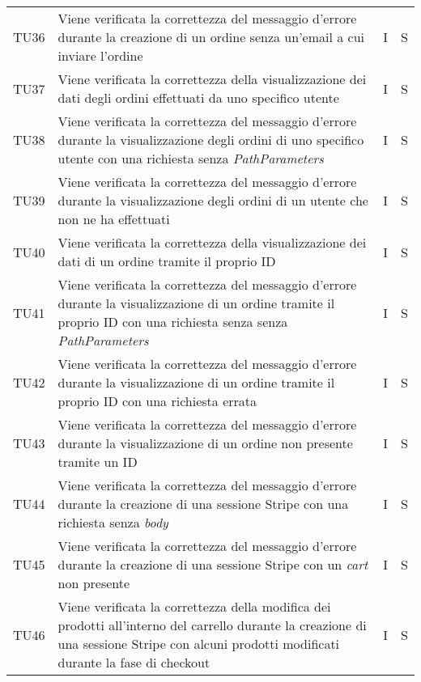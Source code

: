 {\begin{longtable}{C{2cm} C{9.6cm} C{1.5cm} C{1cm}}
TU36 & Viene verificata la correttezza del messaggio d'errore durante la creazione di un ordine senza un'email a cui inviare l'ordine & I & S\\

TU37 & Viene verificata la correttezza della visualizzazione dei dati degli ordini effettuati da uno specifico utente & I & S\\

TU38 & Viene verificata la correttezza del messaggio d'errore durante la visualizzazione degli ordini di uno specifico utente con una richiesta senza \textit{PathParameters} & I & S\\

TU39 & Viene verificata la correttezza del messaggio d'errore durante la visualizzazione degli ordini di un utente che non ne ha effettuati & I & S\\

TU40 & Viene verificata la correttezza della visualizzazione dei dati di un ordine tramite il proprio ID & I & S\\

TU41 & Viene verificata la correttezza del messaggio d'errore durante la visualizzazione di un ordine tramite il proprio ID con una richiesta senza senza \textit{PathParameters} & I & S\\

TU42 & Viene verificata la correttezza del messaggio d'errore durante la visualizzazione di un ordine tramite il proprio ID con una richiesta errata & I & S\\

TU43 & Viene verificata la correttezza del messaggio d'errore durante la visualizzazione di un ordine non presente tramite un ID & I & S\\

TU44 & Viene verificata la correttezza del messaggio d'errore durante la creazione di una sessione Stripe con una richiesta senza \textit{body} & I & S\\

TU45 & Viene verificata la correttezza del messaggio d'errore durante la creazione di una sessione Stripe con un \textit{cart} non presente & I & S\\


TU46 & Viene verificata la correttezza della modifica dei prodotti all'interno del carrello durante la creazione di una sessione Stripe con alcuni prodotti modificati durante la fase di checkout & I & S\\


\end{longtable}}
